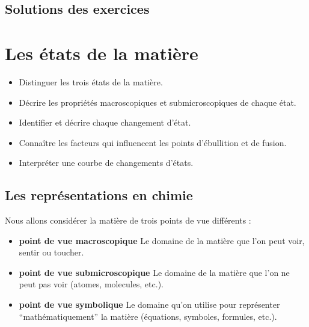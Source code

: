 \documentclass[
  11pt,
  a4paper,
  openany]{book}
\providecommand{\tightlist}{%
  \setlength{\itemsep}{0pt}\setlength{\parskip}{0pt}}
\begin{document}
\newpage

\section{Solutions des exercices} \shipoutAnswer

\chapter{Les états de la matière}\label{les-uxe9tats-de-la-matiuxe8re}

\begin{objectives}

\begin{itemize}
\tightlist
\item
  Distinguer les trois états de la matière.
\item
  Décrire les propriétés macroscopiques et submicroscopiques de chaque état.
\item
  Identifier et décrire chaque changement d'état.
\item
  Connaître les facteurs qui influencent les points d'ébullition et de fusion.
\item
  Interpréter une courbe de changements d'états.
\end{itemize}

\end{objectives}

\section{Les représentations en chimie}\label{les-repruxe9sentations-en-chimie}

Nous allons considérer la matière de trois points de vue différents :

\begin{itemize}
\tightlist
\item
  \textbf{point de vue macroscopique}
  Le domaine de la matière que l'on peut voir, sentir ou toucher.
\item
  \textbf{point de vue submicroscopique}
  Le domaine de la matière que l'on ne peut pas voir (atomes, molecules, etc.).
\item
  \textbf{point de vue symbolique}
  Le domaine qu'on utilise pour représenter ``mathématiquement'' la matière (équations, symboles, formules, etc.).
\end{itemize}
\end{document}
